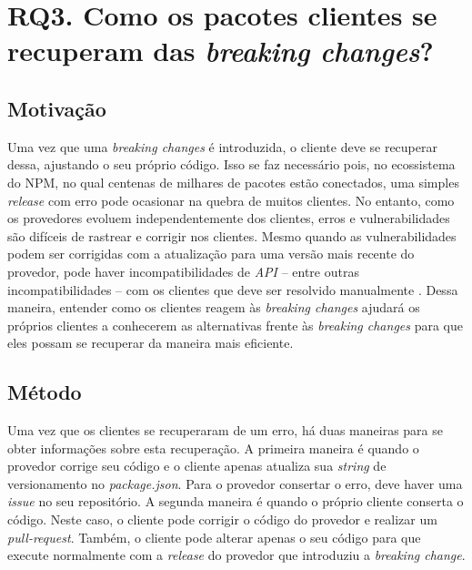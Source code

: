 




\section{RQ3. Como os pacotes clientes se recuperam das \textit{breaking changes}?}
\label{sec:rq3}

\subsection{Motivação}
\label{mot:rq3}
Uma vez que uma \textit{breaking changes} é introduzida, o cliente deve se recuperar dessa, ajustando o seu próprio código. Isso se faz necessário pois, no ecossistema do  \gls{NPM}, no qual centenas de milhares de pacotes estão conectados, uma simples \textit{release} com erro pode ocasionar na quebra de muitos clientes. No entanto, como os provedores evoluem independentemente dos clientes, erros e vulnerabilidades são difíceis de rastrear e corrigir nos clientes. Mesmo quando as vulnerabilidades podem ser corrigidas com a atualização para uma versão mais recente do provedor, pode haver incompatibilidades de \textit{API} -- entre outras incompatibilidades -- com os clientes que deve ser resolvido manualmente \cite{Foo:2018:ESC:3236024.3275535}. Dessa maneira, entender como os clientes reagem às \textit{breaking changes} ajudará os próprios clientes a conhecerem as alternativas frente às \textit{breaking changes} para que eles possam se recuperar da maneira mais eficiente.

\subsection{Método}
\label{apr:rq3}
Uma vez que os clientes se recuperaram de um erro, há duas maneiras para se obter informações sobre esta recuperação. A primeira maneira é quando o provedor corrige seu código e o cliente apenas atualiza sua \textit{string} de versionamento no \textit{package.json}. Para o provedor consertar o erro, deve haver uma \textit{issue} no seu repositório. A segunda maneira é quando o próprio cliente conserta o código. Neste caso, o cliente pode corrigir o código do provedor e realizar um \textit{pull-request}. Também, o cliente pode alterar apenas o seu código para que execute normalmente com a \textit{release} do provedor que introduziu a \textit{breaking change}.

